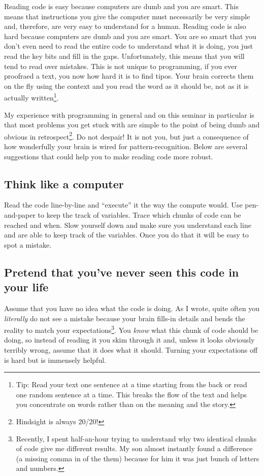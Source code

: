 \documentclass[
]{book}
\begin{document}
Reading code is easy because computers are dumb and you are smart. This means that instructions you give the computer must necessarily be very simple and, therefore, are very easy to understand for a human. Reading code is also hard because computers are dumb and you are smart. You are so smart that you don't even need to read the entire code to understand what it is doing, you just read the key bits and fill in the gaps. Unfortunately, this means that you will tend to read over mistakes. This is not unique to programming, if you ever proofraed a text, you now how hard it is to find tipos. Your brain corrects them on the fly using the context and you read the word as it should be, not as it is actually written\footnote{Tip: Read your text one sentence at a time starting from the back or read one random sentence at a time. This breaks the flow of the text and helps you concentrate on words rather than on the meaning and the story.}.

My experience with programming in general and on this seminar in particular is that most problems you get stuck with are simple to the point of being dumb and obvious in retrospect\footnote{Hindsight is always 20/20!}. Do not despair! It is not you, but just a consequence of how wonderfully your brain is wired for pattern-recognition. Below are several suggestions that could help you to make reading code more robust.

\hypertarget{think-like-a-computer}{%
\subsection{Think like a computer}\label{think-like-a-computer}}

Read the code line-by-line and ``execute'' it the way the compute would. Use pen-and-paper to keep the track of variables. Trace which chunks of code can be reached and when. Slow yourself down and make sure you understand each line and are able to keep track of the variables. Once you do that it will be easy to spot a mistake.

\hypertarget{pretend-that-youve-never-seen-this-code-in-your-life}{%
\subsection{Pretend that you've never seen this code in your life}\label{pretend-that-youve-never-seen-this-code-in-your-life}}

Assume that you have no idea what the code is doing. As I wrote, quite often you \emph{literally} do not see a mistake because your brain fills-in details and bends the reality to match your expectations\footnote{Recently, I spent half-an-hour trying to understand why two identical chunks of code give me different results. My son almost instantly found a difference (a missing comma in of the them) because for him it was just bunch of letters and numbers.}. You \emph{know} what this chunk of code should be doing, so instead of reading it you skim through it and, unless it looks obviously terribly wrong, assume that it does what it should. Turning your expectations off is hard but is immensely helpful.
\end{document}
